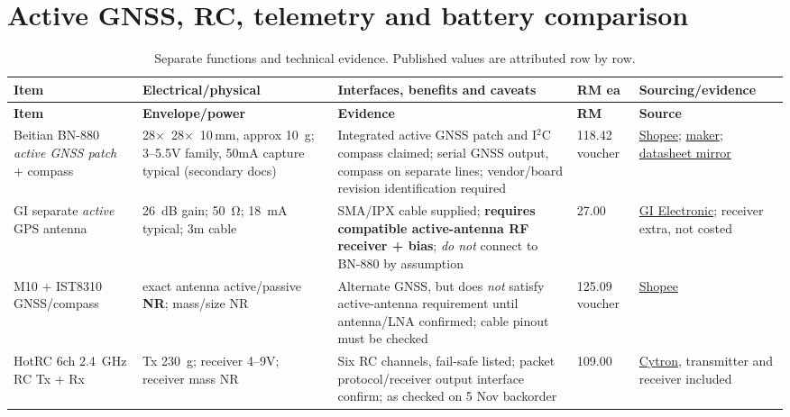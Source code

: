 \section{Active GNSS, RC, telemetry and battery comparison}
\small
\begin{longtable}{L{29mm}L{29mm}L{48mm}L{18mm}L{36mm}}
\caption{Separate functions and technical evidence. Published values are attributed row by row.}\label{tab:other}\\
\toprule \textbf{Item} & \textbf{Electrical/physical} & \textbf{Interfaces, benefits and caveats} & \textbf{RM ea} & \textbf{Sourcing/evidence}\\\midrule\endfirsthead
\toprule \textbf{Item} & \textbf{Envelope/power} & \textbf{Evidence} & \textbf{RM} & \textbf{Source}\\\midrule\endhead\bottomrule\endfoot
Beitian BN-880 \emph{active GNSS patch} + compass \cite{bnShop,bnData,bnMaker} & \mbox{28$\times$ 28$\times$ 10\,mm}, approx \SI{10}{g}; 3--5.5V family, 50mA capture typical (secondary docs) & Integrated active GNSS patch and I$^2$C compass claimed; serial GNSS output, compass on separate lines; vendor/board revision identification required & 118.42 voucher & \href{https://shopee.com.my/Beitian-BN-880-Flight-Control-GPS-Module-Dual-Module-Compass-With-Cable-i.23419821.885903382}{Shopee}; \href{https://store.beitian.com/it/blogs/news/gps-modules-with-arduino-and-raspberry-pi}{maker}; \href{https://manuals.plus/ae/1005008660355732}{datasheet mirror}\\
GI separate \emph{active} GPS antenna \cite{activeShop} & \SI{26}{dB} gain; \SI{50}{\ohm}; \SI{18}{mA} typical; 3m cable & SMA/IPX cable supplied; \textbf{requires compatible active-antenna RF receiver + bias}; \emph{do not} connect to BN-880 by assumption & 27.00 & \href{https://www.gie.com.my/shop.php?action=wireless/gps/gps_active_ant}{GI Electronic}; receiver extra, not costed\\
M10 + IST8310 GNSS/compass \cite{m10Shop} & exact antenna active/passive \textbf{NR}; mass/size NR & Alternate GNSS, but does \emph{not} satisfy active-antenna requirement until antenna/LNA confirmed; cable pinout must be checked & 125.09 voucher & \href{https://shopee.com.my/M10-GPS-Module-With-External-IST8310-Compass-For-Pixhawk-2.4.8-PIXRACER-R15-RC-Quadcopter-Plane-Drone-RC-Boat-RC-Upgrade-Parts-i.487084356.42854127762}{Shopee}\\
HotRC 6ch \SI{2.4}{GHz} RC Tx + Rx \cite{hotrc} & Tx \SI{230}{g}; receiver 4--9V; receiver mass NR & Six RC channels, fail-safe listed; packet protocol/receiver output interface confirm; as checked on 5 Nov backorder & 109.00 & \href{https://my.cytron.io/c-rf-module/p-hotrc-6-channels-rc-radio-transmitter-and-receiver}{Cytron}, transmitter and receiver included\\

\end{longtable}
